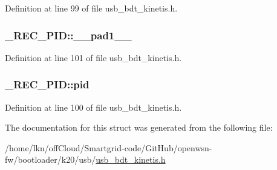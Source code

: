 Definition at line 99 of file usb\+\_\+bdt\+\_\+kinetis.\+h.

\subsubsection[{\texorpdfstring{\+\_\+\+\_\+pad1\+\_\+\+\_\+}{__pad1__}}]{ \+\_\+\+R\+E\+C\+\_\+\+P\+I\+D\+::\+\_\+\+\_\+pad1\+\_\+\+\_\+}\hypertarget{struct___r_e_c___p_i_d_aa2a616bf23cf8b7189c342bbaa30b548}{}\label{struct___r_e_c___p_i_d_aa2a616bf23cf8b7189c342bbaa30b548}


Definition at line 101 of file usb\+\_\+bdt\+\_\+kinetis.\+h.

\subsubsection[{\texorpdfstring{pid}{pid}}]{ \+\_\+\+R\+E\+C\+\_\+\+P\+I\+D\+::pid}\hypertarget{struct___r_e_c___p_i_d_ad2360dd1337a1da11e55f7d579e62366}{}\label{struct___r_e_c___p_i_d_ad2360dd1337a1da11e55f7d579e62366}


Definition at line 100 of file usb\+\_\+bdt\+\_\+kinetis.\+h.



The documentation for this struct was generated from the following file\+:\begin{DoxyCompactItemize}
\item 
/home/lkn/off\+Cloud/\+Smartgrid-\/code/\+Git\+Hub/openwsn-\/fw/bootloader/k20/usb/\hyperlink{usb__bdt__kinetis_8h}{usb\+\_\+bdt\+\_\+kinetis.\+h}\end{DoxyCompactItemize}
